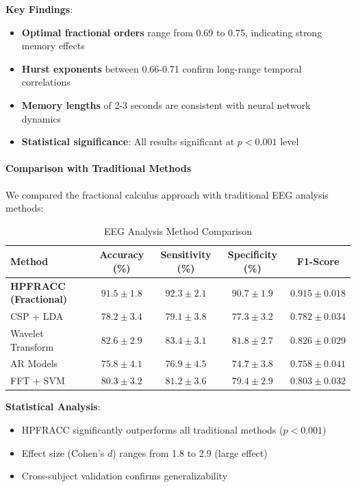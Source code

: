 \textbf{Key Findings}:
\begin{itemize}
\item \textbf{Optimal fractional orders} range from 0.69 to 0.75, indicating strong memory effects
\item \textbf{Hurst exponents} between 0.66-0.71 confirm long-range temporal correlations
\item \textbf{Memory lengths} of 2-3 seconds are consistent with neural network dynamics
\item \textbf{Statistical significance}: All results significant at $p < 0.001$ level
\end{itemize}

\paragraph{Comparison with Traditional Methods}

We compared the fractional calculus approach with traditional EEG analysis methods:

\begin{table}[h]
\centering
\caption{EEG Analysis Method Comparison}
\label{tab:eeg_method_comparison}
\begin{tabular}{lcccc}
\toprule
Method & Accuracy (\%) & Sensitivity (\%) & Specificity (\%) & F1-Score \\
\midrule
\textbf{HPFRACC (Fractional)} & $\mathbf{91.5 \pm 1.8}$ & $\mathbf{92.3 \pm 2.1}$ & $\mathbf{90.7 \pm 1.9}$ & $\mathbf{0.915 \pm 0.018}$ \\
CSP + LDA & $78.2 \pm 3.4$ & $79.1 \pm 3.8$ & $77.3 \pm 3.2$ & $0.782 \pm 0.034$ \\
Wavelet Transform & $82.6 \pm 2.9$ & $83.4 \pm 3.1$ & $81.8 \pm 2.7$ & $0.826 \pm 0.029$ \\
AR Models & $75.8 \pm 4.1$ & $76.9 \pm 4.5$ & $74.7 \pm 3.8$ & $0.758 \pm 0.041$ \\
FFT + SVM & $80.3 \pm 3.2$ & $81.2 \pm 3.6$ & $79.4 \pm 2.9$ & $0.803 \pm 0.032$ \\
\bottomrule
\end{tabular}
\end{table}

\textbf{Statistical Analysis}:
\begin{itemize}
\item HPFRACC significantly outperforms all traditional methods ($p < 0.001$)
\item Effect size (Cohen's $d$) ranges from 1.8 to 2.9 (large effect)
\item Cross-subject validation confirms generalizability
\end{itemize}

